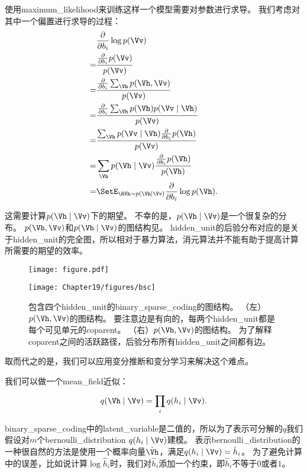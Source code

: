 使用\gls{maximum_likelihood}来训练这样一个模型需要对参数进行求导。
我们考虑对其中一个偏置进行求导的过程：
\begin{align}
		& \frac{\partial}{\partial b_i} \log p(\Vv) \\
		= &  \frac{\frac{\partial}{\partial b_i} p(\Vv)}{p(\Vv)}\\
		= & \frac{\frac{\partial}{\partial b_i} \sum_{\Vh}^{} p(\Vh,\Vv)}{p(\Vv)}\\
		= &  \frac{\frac{\partial}{\partial b_i} \sum_{\Vh}^{} p(\Vh) p(\Vv\mid \Vh)  }{p(\Vv)}\\
		= &  \frac{ \sum_{\Vh}^{}  p(\Vv\mid \Vh) \frac{\partial}{\partial b_i} p(\Vh) }{p(\Vv)}\\
		= &  \sum_{\Vh}^{}  p(\Vh\mid \Vv) \frac{  \frac{\partial}{\partial b_i} p(\Vh) }{p(\Vh)}\\
		= & \SetE_{\RVh\sim p(\Vh\mid\Vv)} \frac{\partial}{\partial b_i}\log p(\Vh).
\end{align}

这需要计算$p(\Vh\mid\Vv)$下的期望。
不幸的是，$p(\Vh\mid\Vv)$是一个很复杂的分布。
$p(\Vh,\Vv)$和$p(\Vh\mid\Vv)$的图结构见。
\gls{hidden_unit}的后验分布对应的是关于\gls{hidden_unit}的完全图，所以相对于暴力算法，消元算法并不能有助于提高计算所需要的期望的效率。


\begin{figure}[!htb]
\ifOpenSource
\centerline{\texttt{[image: figure.pdf]}}
\else
	\centerline{\texttt{[image: Chapter19/figures/bsc]}}
\fi
\caption{包含四个\gls{hidden_unit}的\gls{binary_sparse_coding}的图结构。
（左）$p(\Vh,\Vv)$的图结构。
要注意边是有向的，每两个\gls{hidden_unit}都是每个可见单元的\gls{coparent}。
（右）$p(\Vh,\Vv)$的图结构。
为了解释\gls{coparent}之间的活跃路径，后验分布所有\gls{hidden_unit}之间都有边。}
	\label{fig:bsc}
\end{figure}



取而代之的是，我们可以应用变分推断和变分学习来解决这个难点。


我们可以做一个\gls{mean_field}近似：
\begin{align}
	q(\Vh\mid\Vv) = \prod_{i}^{}q(h_i\mid\Vv).
\end{align}


\gls{binary_sparse_coding}中的\gls{latent_variable}是二值的，所以为了表示可分解的$q$我们假设对$m$个\gls{bernoulli_distribution} $q(h_i\mid\Vv)$建模。
表示\gls{bernoulli_distribution}的一种很自然的方法是使用一个概率向量$\hat{\Vh}$，满足$q(h_i\mid\Vv) = \hat{h}_i$。
为了避免计算中的误差，比如说计算$\log \hat{h}_i$时，我们对$\hat{h}_i$添加一个约束，即$\hat{h}_i$不等于$0$或者$1$。


